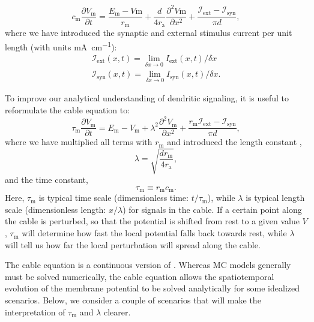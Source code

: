 \begin{equation}
c_\text{m} \frac{\partial V_\mathrm{m}}{\partial t} = \frac{E_\text{m}-V\mathrm{m}}{r_\text{m}} +  \frac{d}{4 r_\text{a}}  \frac{\partial^2 V\mathrm{m}}{\partial x^2} +  \frac{\mathcal{I}_{\mathrm{ext}}-\mathcal{I}_{\mathrm{syn}}}{\pi d},
\label{eq:Neuron:cable}
\end{equation}
where we have introduced the synaptic and external stimulus current per unit length (with units  \si{\milli\ampere\per\centi\metre}):
\begin{eqnarray}
\mathcal{I}_{\mathrm{ext}}(x,t) = \lim_{\delta x \to 0} I_{\mathrm{ext}}(x,t)/\delta x
\nonumber \\
\mathcal{I}_{\mathrm{syn}}(x,t) = \lim_{\delta x \to 0} I_{\mathrm{syn}}(x,t)/\delta x.
\label{eq:Neuron:CurrentPerUnitLength}
\end{eqnarray}

To improve our analytical understanding of dendritic signaling, it is useful to reformulate the cable equation to:
\begin{equation}
\tau_\text{m} \frac{\partial V_\mathrm{m}}{\partial t} = E_\mathrm{m}-V_\mathrm{m} +   \lambda^2  \frac{\partial^2 V_\mathrm{m}}{\partial x^2}  + \frac{r_\mathrm{m} \mathcal{I}_{\mathrm{ext}} - \mathcal{I}_{\mathrm{syn}} }{\pi d},
\label{eq:Neuron:cable2}
\end{equation}
where we have multiplied all terms with $r_\text{m}$ and introduced the length constant ,
\begin{equation}
\lambda = \sqrt{\frac{d r_\text{m}}{4 r_\text{a}}}, 
\label{eq:Neuron:lengthconst}
\end{equation}
and the time constant, 
\begin{equation}
\tau_\text{m} \equiv r_\text{m} c_\text{m}.
\label{eq:Neuron:timeconst}
\end{equation}
Here, $\tau_\mathrm{m}$ is typical time scale (dimensionless time: $t/\tau_\mathrm{m}$), while $\lambda$  is typical length scale  (dimensionless length: $x/\lambda$) for signals in the cable. If a certain point along the cable is perturbed, so that the potential is shifted from rest to a given value $V$, $\tau_\text{m}$ will determine how fast the local potential falls back towards rest, while $\lambda$ will tell us how far the local perturbation will spread along the cable. 

The cable equation is a continuous version of . Whereas MC models generally must be solved numerically, the cable equation allows the spatiotemporal evolution of the membrane potential to be solved analytically for some idealized scenarios. Below, we consider a couple of scenarios that will  make the interpretation of $\tau_\text{m}$ and $\lambda$ clearer. 


